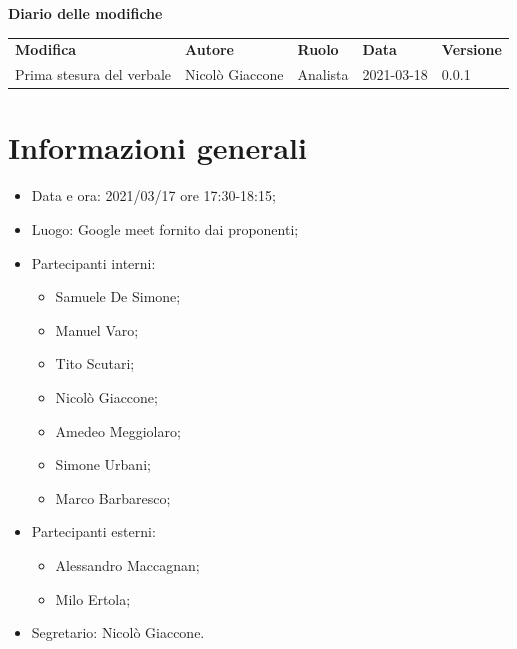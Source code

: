 \documentclass[a4paper]{article}
\begin{document}
    \begin{center}
        \textbf{\Large Diario delle modifiche}\\
        \vspace{10px}
        \begin{table}[h!]
        \centering
        \renewcommand{\arraystretch}{1.8}
        \begin{tabular}{p{150px} p{90px} p{50px} p{60px} p{45px}}
            \rowcolor{logo!70} \textbf{Modifica} & \textbf{Autore} & \textbf{Ruolo} & \textbf{Data} & \textbf{Versione}\\
            Prima stesura del verbale & Nicolò Giaccone & Analista & 2021-03-18 & 0.0.1 \\    
        \end{tabular}
    \end{table}
    \end{center}

    \newpage
    \tableofcontents
    \newpage
    \section{Informazioni generali}
    \begin{itemize}
        \item Data e ora: 2021/03/17 ore 17:30-18:15;
        \item Luogo: Google meet fornito dai proponenti;
        \item Partecipanti interni:  
        \begin{itemize}
            \item  Samuele De Simone;
            \item  Manuel Varo;
            \item  Tito Scutari;
            \item  Nicolò Giaccone;
            \item  Amedeo Meggiolaro;
            \item  Simone Urbani;
            \item  Marco Barbaresco;
        \end{itemize}
        \item Partecipanti esterni: 
        \begin{itemize}
            \item Alessandro Maccagnan; 
            \item Milo Ertola;
        \end{itemize} 
        \item Segretario: Nicolò Giaccone.
    \end{itemize}
\end{document}
